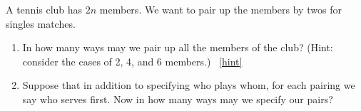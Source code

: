 \documentclass{book}
\begin{document}
\setcounter{project}{86}
\addtocounter{project}{-1}
\begin{activity}[]\label{tennispairings1}
\hypertarget{p-674}{}%
A tennis club has \(2n\) members. We want to pair up the members by twos for singles matches.%
\begin{enumerate}[font=\bfseries,label=(\alph*),ref=\alph*]
\item\label{task-134} \hypertarget{p-675}{}%
In how many ways may we pair up all the members of the club? (Hint: consider the cases of 2, 4, and 6 members.)%
~\hfill{\tiny\hyperlink{a-86.a}{[hint]}\hypertarget{q-86.a}{}}\item\label{task-135} \hypertarget{p-678}{}%
Suppose that in addition to specifying who plays whom, for each pairing we say who serves first.  Now in how many ways may we specify our pairs?%
\end{enumerate}
\end{activity}
\end{document}

